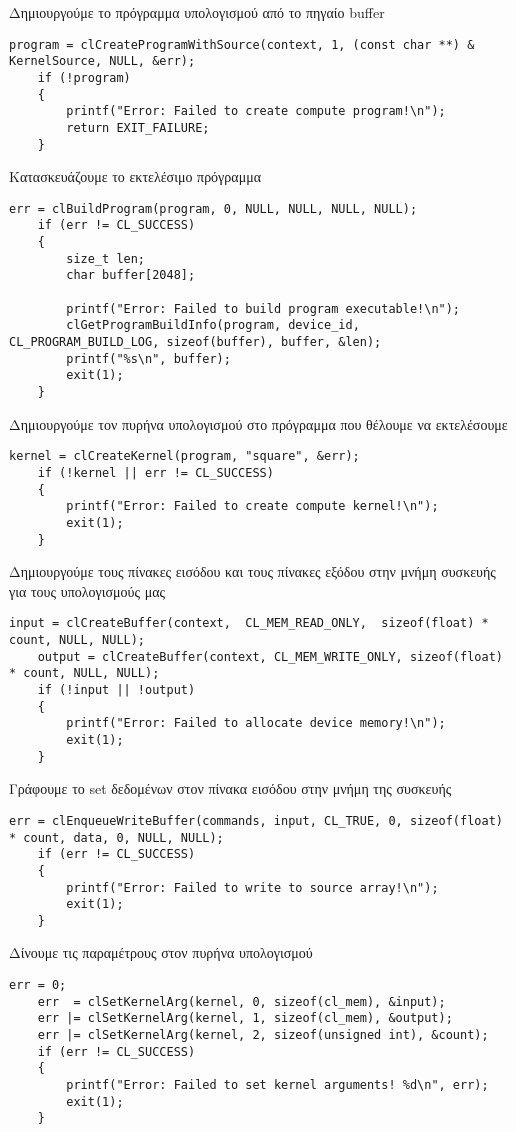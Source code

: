 Δημιουργούμε το πρόγραμμα υπολογισμού από το πηγαίο buffer
\begin{lstlisting}[basicstyle=\scriptsize]
    program = clCreateProgramWithSource(context, 1, (const char **) & KernelSource, NULL, &err);
    if (!program)
    {
        printf("Error: Failed to create compute program!\n");
        return EXIT_FAILURE;
    }
\end{lstlisting}
Κατασκευάζουμε το εκτελέσιμο πρόγραμμα
\begin{lstlisting}[basicstyle=\scriptsize]
    err = clBuildProgram(program, 0, NULL, NULL, NULL, NULL);
    if (err != CL_SUCCESS)
    {
        size_t len;
        char buffer[2048];
 
        printf("Error: Failed to build program executable!\n");
        clGetProgramBuildInfo(program, device_id, CL_PROGRAM_BUILD_LOG, sizeof(buffer), buffer, &len);
        printf("%s\n", buffer);
        exit(1);
    }
\end{lstlisting}
Δημιουργούμε τον πυρήνα υπολογισμού στο πρόγραμμα που θέλουμε να εκτελέσουμε
\begin{lstlisting}[basicstyle=\scriptsize]
    kernel = clCreateKernel(program, "square", &err);
    if (!kernel || err != CL_SUCCESS)
    {
        printf("Error: Failed to create compute kernel!\n");
        exit(1);
    }
\end{lstlisting}
Δημιουργούμε τους πίνακες εισόδου και τους πίνακες εξόδου στην μνήμη συσκευής για τους υπολογισμούς μας
\begin{lstlisting}[basicstyle=\scriptsize]
    input = clCreateBuffer(context,  CL_MEM_READ_ONLY,  sizeof(float) * count, NULL, NULL);
    output = clCreateBuffer(context, CL_MEM_WRITE_ONLY, sizeof(float) * count, NULL, NULL);
    if (!input || !output)
    {
        printf("Error: Failed to allocate device memory!\n");
        exit(1);
    }    
\end{lstlisting}
Γράφουμε το set δεδομένων στον πίνακα εισόδου στην μνήμη της συσκευής
\begin{lstlisting}[basicstyle=\scriptsize]
    err = clEnqueueWriteBuffer(commands, input, CL_TRUE, 0, sizeof(float) * count, data, 0, NULL, NULL);
    if (err != CL_SUCCESS)
    {
        printf("Error: Failed to write to source array!\n");
        exit(1);
    }
\end{lstlisting}
Δίνουμε τις παραμέτρους στον πυρήνα υπολογισμού
\begin{lstlisting}[basicstyle=\scriptsize]
    err = 0;
    err  = clSetKernelArg(kernel, 0, sizeof(cl_mem), &input);
    err |= clSetKernelArg(kernel, 1, sizeof(cl_mem), &output);
    err |= clSetKernelArg(kernel, 2, sizeof(unsigned int), &count);
    if (err != CL_SUCCESS)
    {
        printf("Error: Failed to set kernel arguments! %d\n", err);
        exit(1);
    }
\end{lstlisting}
